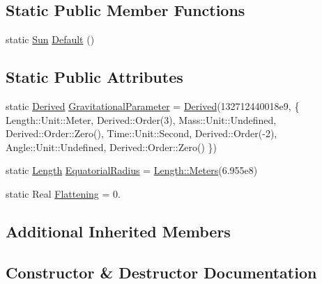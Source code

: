\subsection*{Static Public Member Functions}
\begin{DoxyCompactItemize}
\item 
static \hyperlink{classlibrary_1_1physics_1_1env_1_1obj_1_1celest_1_1_sun}{Sun} \hyperlink{classlibrary_1_1physics_1_1env_1_1obj_1_1celest_1_1_sun_a4854f1ce74cbabb804d0084b71e76bcf}{Default} ()
\end{DoxyCompactItemize}
\subsection*{Static Public Attributes}
\begin{DoxyCompactItemize}
\item 
static \hyperlink{classlibrary_1_1physics_1_1units_1_1_derived}{Derived} \hyperlink{classlibrary_1_1physics_1_1env_1_1obj_1_1celest_1_1_sun_abdaf89ab0651e1cd00701de41f728427}{Gravitational\+Parameter} = \hyperlink{classlibrary_1_1physics_1_1units_1_1_derived}{Derived}(132712440018e9, \{ Length\+::\+Unit\+::\+Meter, Derived\+::\+Order(3), Mass\+::\+Unit\+::\+Undefined, Derived\+::\+Order\+::\+Zero(), Time\+::\+Unit\+::\+Second, Derived\+::\+Order(-\/2), Angle\+::\+Unit\+::\+Undefined, Derived\+::\+Order\+::\+Zero() \})
\item 
static \hyperlink{classlibrary_1_1physics_1_1units_1_1_length}{Length} \hyperlink{classlibrary_1_1physics_1_1env_1_1obj_1_1celest_1_1_sun_a48679ac65c067b77adf005ce9ca5cfca}{Equatorial\+Radius} = \hyperlink{classlibrary_1_1physics_1_1units_1_1_length_ad523a3737d5c3f23a64588eac83f2148}{Length\+::\+Meters}(6.\+955e8)
\item 
static Real \hyperlink{classlibrary_1_1physics_1_1env_1_1obj_1_1celest_1_1_sun_a48caf436831d176c692b6aa714b77676}{Flattening} = 0.
\end{DoxyCompactItemize}
\subsection*{Additional Inherited Members}


\subsection{Constructor \& Destructor Documentation}
\mbox{\label{classlibrary_1_1physics_1_1env_1_1obj_1_1celest_1_1_sun_ada5eefc36e00d3e68d60c94b85144388}} 
